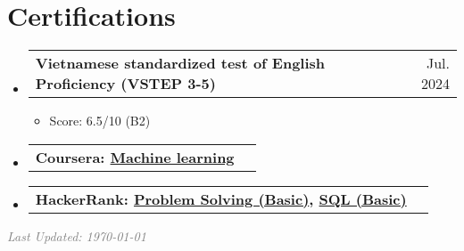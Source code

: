 \documentclass[letterpaper,11pt]{article}
\makeatletter
\newcommand{\heading}[4]{
    \normalsize
    \begin{tabular*}{0.97\textwidth}[t]{l@{\extracolsep{\fill}}r}
      \textbf{#1} & #2 \\[-2pt]
      \textit{\small#3} & \textit{\small #4}
    \end{tabular*}
    \vspace{-2pt}
}
\newcommand{\subheading}[2]{
    \normalsize
    \begin{tabular*}{0.97\textwidth}[t]{l@{\extracolsep{\fill}}r}
      \textbf{#1} & #2 \\
    \end{tabular*}
    \vspace{-2pt}
}
\makeatother
\begin{document}
\section{Certifications}
    \begin{itemize}
        
        


        \item \subheading{Vietnamese standardized test of English Proficiency (VSTEP 3-5) }{Jul. 2024}
            \begin{itemize}
                \item Score: 6.5/10 (B2)
            \end{itemize}
        
        \item \subheading{Coursera: \normalfont \href{https://coursera.org/share/c68e20d03f93ad3689a80fc68a52989c}{Machine learning}}{}
        
        \item \subheading{HackerRank: \normalfont \href{https://www.hackerrank.com/certificates/6286b603c4f7}{Problem Solving (Basic)}, \href{https://www.hackerrank.com/certificates/0cbeca00b68c}{SQL (Basic)}}{}
    
    
    \end{itemize}
    



\vfill
    \hfill\textcolor{gray}{\textit{Last Updated: \today}}
\end{document}
